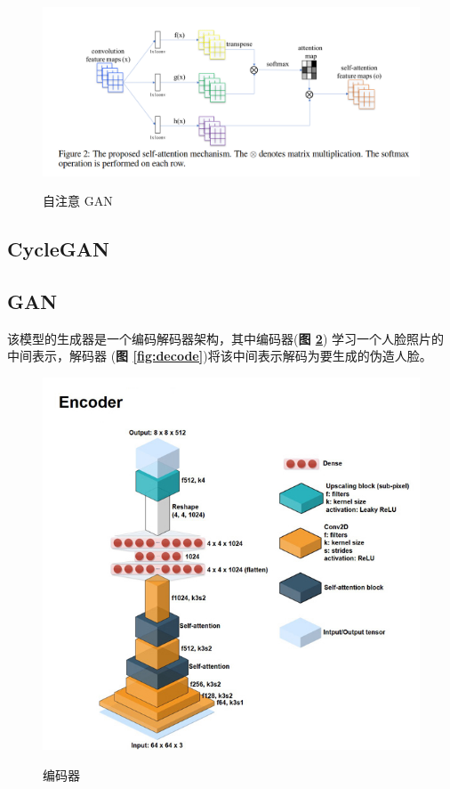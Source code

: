 \begin{figure}[h!]
	\caption{自注意 GAN}
	\centering
	\includegraphics[width=\textwidth]{SAGAN.png}
	\label{fig:sagan}
\end{figure}


\subsection{CycleGAN}


\subsection{GAN}
该模型的生成器是一个编码解码器架构，其中编码器(\textbf{图 \ref{fig:encode}}) 学习一个人脸照片的中间表示，解码器 (\textbf{图 \ref{fig:decode}})将该中间表示解码为要生成的伪造人脸。

\begin{figure}[h!]
	\caption{编码器}
	\centering
	\includegraphics[width=\textwidth]{encode.jpg}
	\label{fig:encode}
\end{figure}

